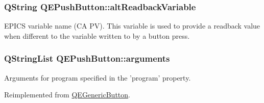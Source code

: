 \hypertarget{classQEPushButton_ab6eb074afea7056b844a4a712cdf594c}{
\subsubsection[{altReadbackVariable}]{\setlength{\rightskip}{0pt plus 5cm}QString QEPushButton::altReadbackVariable}}
\label{classQEPushButton_ab6eb074afea7056b844a4a712cdf594c}
EPICS variable name (CA PV). This variable is used to provide a readback value when different to the variable written to by a button press. \hypertarget{classQEPushButton_ae25b176db2b427089e1b1532a3c3ce52}{
\subsubsection[{arguments}]{\setlength{\rightskip}{0pt plus 5cm}QStringList QEPushButton::arguments}}
\label{classQEPushButton_ae25b176db2b427089e1b1532a3c3ce52}
Arguments for program specified in the 'program' property. 

Reimplemented from \hyperlink{classQEGenericButton}{QEGenericButton}.

